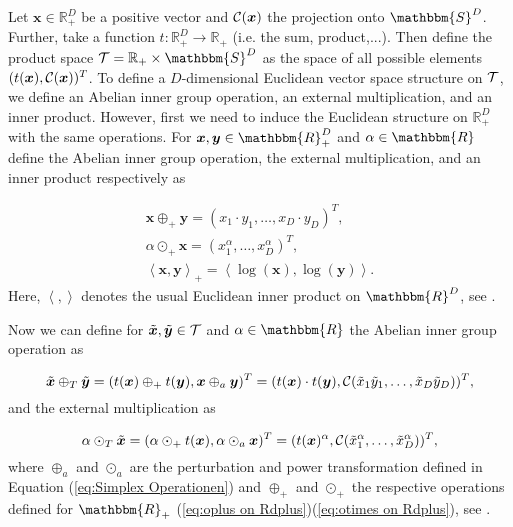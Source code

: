 Let $\bm{x} \in \mathbb{R}^D_+$ be a positive vector and $\mathcal{C}(\bm{x})$ the projection onto $\mathbbm{S}^D$. Further, take a function $t:\mathbb{R}^D_+ \longrightarrow \mathbb{R}_+$ (i.e. the sum, product,...). Then define the product space  $\Tsp = \mathbb{R}_+ \times \mathbbm{S}^D$ as the space of all possible elements $(t(\bm{x}),\mathcal{C}(\bm{x}))^T$. To define a $D$-dimensional Euclidean vector space structure on $\mathcal{T}$, we define an Abelian inner group operation, an external multiplication, and an inner product. However, first we need to induce the Euclidean structure on $\mathbb{R}_+^D$ with the same operations. For $\bm{x},\bm{y} \in \mathbbm{R}_+^D$ and $\alpha \in \mathbbm{R}$ define the Abelian inner group operation, the external multiplication, and an inner product respectively as 

\begin{gather}
\bm{x} \oplus_+ \bm{y}= (x_1\cdot y_1,\ldots,x_D \cdot y_D)^T, \label{eq:oplus on Rdplus} \\
\alpha \odot_+ \bm{x} = (x_1^{\alpha},\ldots,x_D^{\alpha})^T, \label{eq:otimes on Rdplus} \\
\left\langle \bm{x},\bm{y} \right\rangle_+ = \left\langle \log(\bm{x}),\log(\bm{y}) \right\rangle.
\label{eq:innerproduct on Rdplus}
\end{gather}
%
Here, $\left\langle ,\right\rangle$ denotes the usual Euclidean inner product on $\mathbbm{R}^D$, see \textcite{Pawlowsky:2013}. 

Now we can define for $\tilde{\bm{x}},\tilde{\bm{y}} \in \mathcal{T}$ and $\alpha \in \mathbbm{R}$ the Abelian inner group operation as 

\begin{equation}
\tilde{\bm{x}} \oplus_T \tilde{\bm{y}} = (t(\bm{x}) \oplus_+ t(\bm{y}), \bm{x} \oplus_a \bm{y})^T = (t(\bm{x}) \cdot t(\bm{y}), \mathcal{C}(\tilde{x}_1\tilde{y}_1,\ldots,\tilde{x}_D\tilde{y}_D))^T,
\label{eq:Abelian inner group operation}
\end{equation}
%
and the external multiplication as 

\begin{equation}
\alpha \odot_T \tilde{\bm{x}} = (\alpha \odot_+ t(\bm{x}), \alpha \odot_a \bm{x})^T = (t(\bm{x})^{\alpha},\mathcal{C}(\tilde{x}_1^{\alpha},\ldots,\tilde{x}_D^{\alpha}))^T,
\label{eq:external multiplication}
\end{equation}
%
where $\oplus_a$ and $\odot_a$ are the perturbation and power transformation defined in Equation (\ref{eq:Simplex Operationen}) and $\oplus_+$ and $\odot_+$ the respective operations defined for $\mathbbm{R}_+$ (\ref{eq:oplus on Rdplus})(\ref{eq:otimes on Rdplus}), see \textcite{Pawlowsky:2013}.

